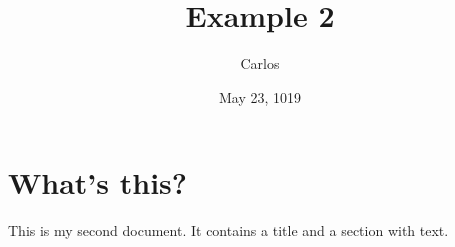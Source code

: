 \documentclass[a4paper,11pt]{article}
\begin{document}
\title{Example 2}
\author{Carlos}
\date{May 23, 1019}
\maketitle %

\section{What's this?}
This is my second document. It contains a title and a section
with text.
\end{document}
